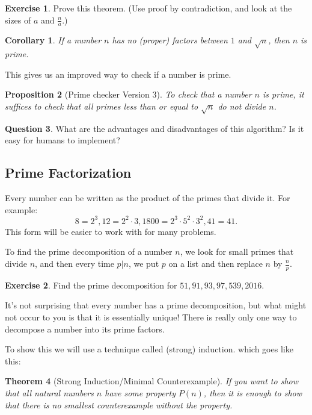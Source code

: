 \documentclass[11pt]{article}
\newtheorem{thm}{Theorem}
\newtheorem{prop}[thm]{Proposition}
\newtheorem{cor}[thm]{Corollary}
\theoremstyle{definition}
\newtheorem{exercise}{Exercise}
\newtheorem{question}[thm]{Question}
\numberwithin{thm}{section}
\begin{document}
\begin{exercise} Prove this theorem. (Use proof by contradiction, and look at the sizes of $a$ and $\frac{n}{a}$.)
\end{exercise}

\begin{cor} If a number $n$ has no (proper) factors between $1$ and $\sqrt{n}$, then $n$ is prime.
\end{cor}

This gives us an improved way to check if a number is prime.

\begin{prop}[Prime checker Version 3] To check that a number $n$ is prime, it suffices to check that all primes less than or equal to $\sqrt{n}$ do not divide $n$.
\end{prop}

\begin{question} What are the advantages and disadvantages of this algorithm? Is it easy for humans to implement?
\end{question}

\subsection{Prime Factorization}

Every number can be written as the product of the primes that divide it. For example:
\[
	8 = 2^3, 12 = 2^2 \cdot 3, 1800 = 2^3 \cdot 5^2 \cdot 3^2, 41 = 41.
\]
This form will be easier to work with for many problems.

To find the prime decomposition of a number $n$, we look for small primes that divide $n$, and then every time $p | n$, we put $p$ on a list and then replace $n$ by $\frac{n}{p}$.

\begin{exercise} Find the prime decomposition for $51, 91, 93, 97, 539, 2016$.
\end{exercise}

It's not surprising that every number has a prime decomposition, but what might not occur to you is that it is essentially unique! There is really only one way to decompose a number into its prime factors.

To show this we will use a technique called (strong) induction. which goes like this:

\begin{thm}[Strong Induction/Minimal Counterexample] If you want to show that all natural numbers $n$ have some property $P(n)$, then it is enough to show that there is no smallest counterexample without the property.
\end{thm}
\end{document}
